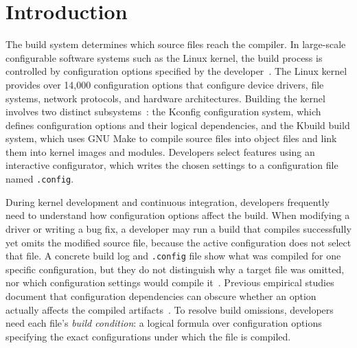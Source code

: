 \documentclass[acmsmall,screen,review,anonymous,nonacm]{acmart}
\begin{document}
\maketitle

\section{Introduction}
  \label{sec:intro}
  The build system determines which source files reach the compiler.
  In large-scale configurable software systems such as the Linux kernel, the build process is controlled by configuration options specified by the developer~\cite{berger2013variability,dietrich2012variability}.
  The Linux kernel provides over 14,000 configuration options that configure device drivers, file systems, network protocols, and hardware architectures.
  Building the kernel involves two distinct subsystems~\cite{nguyen2020kbuild,gazzillo2017kmax}: the Kconfig configuration system, which defines configuration options and their logical dependencies, and the Kbuild build system, which uses GNU Make to compile source files into object files and link them into kernel images and modules.
  Developers select features using an interactive configurator, which writes the chosen settings to a configuration file named \texttt{.config}.

  During kernel development and continuous integration, developers frequently need to understand how configuration options affect the build.
  When modifying a driver or writing a bug fix, a developer may run a build that compiles successfully yet omits the modified source file, because the active configuration does not select that file.
  A concrete build log and \texttt{.config} file show what was compiled for one specific configuration, but they do not distinguish why a target file was omitted, nor which configuration settings would compile it~\cite{nguyen2020kbuild}.
  Previous empirical studies document that configuration dependencies can obscure whether an option actually affects the compiled artifacts~\cite{passos2013coevolution,nadi2014mining}.
  To resolve build omissions, developers need each file's \emph{build condition}: a logical formula over configuration options specifying the exact configurations under which the file is compiled.
\end{document}
